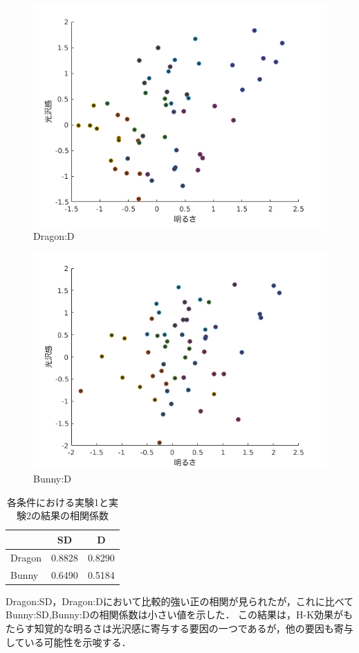     \begin{figure}[h]
        \centering
        \includegraphics[width=12.0cm]{./img/ex3_DD.png}
        \caption{Dragon:D}
        \label{ex3_DD}
    \end{figure}

    \begin{figure}[h]
        \centering
        \includegraphics[width=12.0cm]{./img/ex3_BD.png}
        \caption{Bunny:D}
        \label{ex3_BD}
    \end{figure}

    \begin{table}[h]
        \centering
        \caption{各条件における実験1と実験2の結果の相関係数}
        \begin{tabular}{|l||c|c|} \hline
                        & SD       & D        \\ \hline \hline
            Dragon      & 0.8828   & 0.8290   \\ \hline
            Bunny       & 0.6490   & 0.5184   \\ \hline
        \end{tabular}
    \end{table}

    Dragon:SD，Dragon:Dにおいて比較的強い正の相関が見られたが，これに比べてBunny:SD,Bunny:Dの相関係数は小さい値を示した．
    この結果は，H-K効果がもたらす知覚的な明るさは光沢感に寄与する要因の一つであるが，他の要因も寄与している可能性を示唆する．